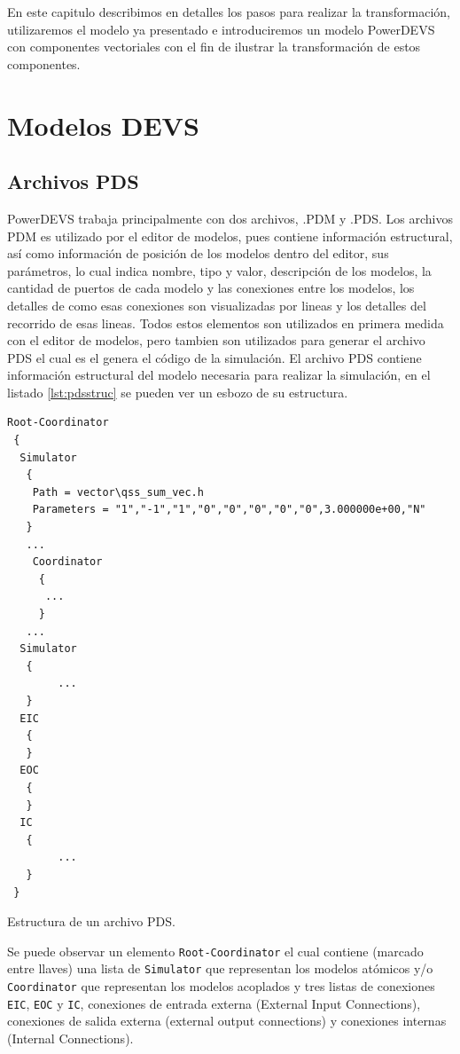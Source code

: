 	En este capitulo describimos en detalles los pasos para realizar la transformación, utilizaremos el modelo ya presentado e introduciremos un modelo PowerDEVS con componentes
	vectoriales con el fin de ilustrar la transformación de estos componentes.

\section{Modelos DEVS}

        \subsection{Archivos PDS}
        PowerDEVS trabaja principalmente con dos archivos, .PDM y .PDS.
        Los archivos PDM es utilizado por el editor de modelos, pues contiene información estructural, así como información de posición de los modelos dentro del 
        editor, sus parámetros, lo cual indica nombre, tipo y valor, descripción de los modelos, la cantidad de puertos de cada modelo y las conexiones
        entre los modelos, los detalles de como esas conexiones son visualizadas por lineas y los detalles del recorrido de esas lineas. 
        Todos estos elementos son utilizados en primera medida con el editor de modelos, pero tambien son utilizados para generar el archivo PDS el cual es el 
        genera el código de la simulación.
        El archivo PDS contiene información estructural del modelo necesaria para realizar la simulación, en el listado \ref{lst:pdsstruc} se pueden ver un 
        esbozo de su estructura.
        
\begin{listing}[H]
\begin{verbatim}
Root-Coordinator
 {
  Simulator
   {
    Path = vector\qss_sum_vec.h
    Parameters = "1","-1","1","0","0","0","0","0",3.000000e+00,"N"
   }
   ...
    Coordinator
     {
      ...
     }
   ...     
  Simulator
   {
        ...
   }
  EIC
   {
   }
  EOC
   {
   }
  IC
   {
        ...
   }
 }
\end{verbatim}
\caption{Estructura de un archivo PDS.}
\label{lst:pdsstruc}
\end{listing}

        Se puede observar un elemento \texttt{Root-Coordinator} el cual contiene (marcado entre llaves) una lista de \texttt{Simulator} que representan 
        los modelos atómicos y/o \texttt{Coordinator} que representan los modelos acoplados y tres listas de 
        conexiones \texttt{EIC}, \texttt{EOC} y \texttt{IC}, conexiones de entrada externa (External Input Connections), 
        conexiones de salida externa (external output connections) y conexiones internas (Internal Connections).


